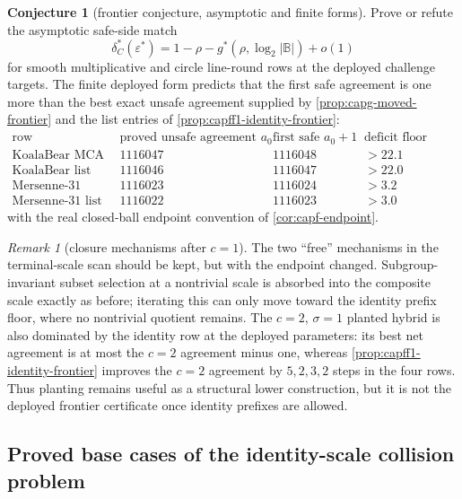 \documentclass[11pt]{article}
\theoremstyle{definition}
\newtheorem{conjecture}[conjecture]{Conjecture}
\theoremstyle{remark}
\newtheorem{remark}[remark]{Remark}
\newcommand{\B}{\mathbb{B}}
\begin{document}
\begin{conjecture}[frontier conjecture, asymptotic and finite forms]\label{prob:capff1-frontier}
Prove or refute the asymptotic safe-side match
\[
        \delta^*_C(\varepsilon^*)=1-\rho-g^*(\rho,\log_2|\B|)+o(1)
\]
for smooth multiplicative and circle line-round rows at the deployed challenge
targets.  The finite deployed form predicts that the first safe agreement is
one more than the best exact unsafe agreement supplied by
\cref{prop:capg-moved-frontier} and the list entries of
\cref{prop:capff1-identity-frontier}:
\[
\begin{array}{c|cc|c}
\text{row} & \text{proved unsafe agreement }a_0 &
\text{first safe }a_0+1 &
\text{deficit floor (bits)}\\ \hline
\text{KoalaBear MCA} & 1116047 & 1116048 & \ensuremath{>22.1}\\
\text{KoalaBear list} & 1116046 & 1116047 & \ensuremath{>22.0}\\
\text{Mersenne-31 MCA} & 1116023 & 1116024 & \ensuremath{>3.2}\\
\text{Mersenne-31 list} & 1116022 & 1116023 & \ensuremath{>3.0}
\end{array}
\]
with the real closed-ball endpoint convention of \cref{cor:capf-endpoint}.
\end{conjecture}

\begin{remark}[closure mechanisms after $c=1$]\label{rem:capff1-closure}
The two ``free'' mechanisms in the terminal-scale scan should be kept, but with the endpoint changed.  Subgroup-invariant subset selection at a nontrivial scale is absorbed into the composite scale exactly as before; iterating this can only move toward the identity prefix floor, where no nontrivial quotient remains.  The $c=2$, $\sigma=1$ planted hybrid is also dominated by the identity row at the deployed parameters: its best net agreement is at most the $c=2$ agreement minus one, whereas \cref{prop:capff1-identity-frontier} improves the $c=2$ agreement by $5,2,3,2$ steps in the four rows.  Thus planting remains useful as a structural lower construction, but it is not the deployed frontier certificate once identity prefixes are allowed.
\end{remark}

\subsection{Proved base cases of the identity-scale collision problem}
\end{document}
